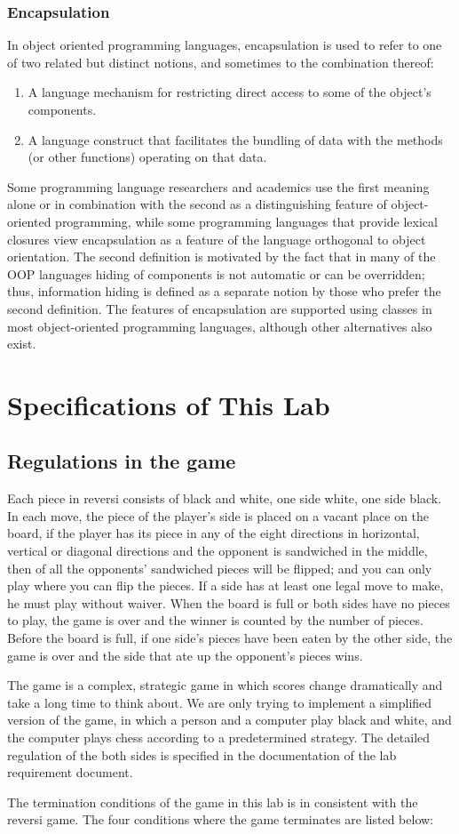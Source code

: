 \documentclass[a4paper]{report}
\begin{document}
\subsection{Encapsulation}
In object oriented programming languages, encapsulation is used to refer to one of two related but distinct notions, and sometimes to the combination thereof: 
\begin{enumerate}
\item A language mechanism for restricting direct access to some of the object's components.
\item A language construct that facilitates the bundling of data with the methods (or other functions) operating on that data.
\end{enumerate}
Some programming language researchers and academics use the first meaning alone or in combination with the second as a distinguishing feature of object-oriented programming, while some programming languages that provide lexical closures view encapsulation as a feature of the language orthogonal to object orientation. 
The second definition is motivated by the fact that in many of the OOP languages hiding of components is not automatic or can be overridden; thus, information hiding is defined as a separate notion by those who prefer the second definition. 
The features of encapsulation are supported using classes in most object-oriented programming languages, although other alternatives also exist. 

\chapter{Specifications of This Lab}
\section{Regulations in the game}
Each piece in reversi consists of black and white, one side white, one side black. In each move, the piece of the player's side is placed on a vacant place on the board, if the player has its piece in any of the eight directions in horizontal, vertical or diagonal directions and the opponent is sandwiched in the middle, then of all the opponents' sandwiched pieces will be flipped; and you can only play where you can flip the pieces. If a side has at least one legal move to make, he must play without waiver. When the board is full or both sides have no pieces to play, the game is over and the winner is counted by the number of pieces. Before the board is full, if one side's pieces have been eaten by the other side, the game is over and the side that ate up the opponent's pieces wins. 
\par
The game is a complex, strategic game in which scores change dramatically and take a long time to think about. We are only trying to implement a simplified version of the game, in which a person and a computer play black and white, and the computer plays chess according to a predetermined strategy. The detailed regulation of the both sides is specified in the  documentation of the lab requirement document.
\par
The termination conditions of the game in this lab is in consistent with the reversi game. The four conditions where the game terminates are listed below:
\end{document}
